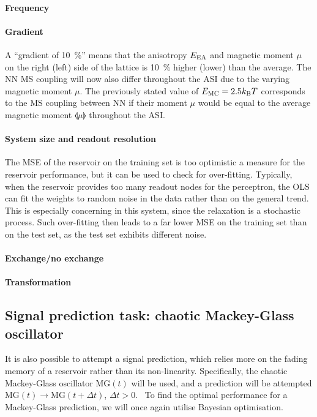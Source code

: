 \paragraph{Frequency}
\paragraph{Gradient}
A ``gradient of \SI{10}{\percent}'' means that the anisotropy $E_\mathrm{EA}$ and magnetic moment $\mu$ on the right (left) side of the lattice is \SI{10}{\percent} higher (lower) than the average.
The NN MS coupling will now also differ throughout the ASI due to the varying magnetic moment $\mu$.
The previously stated value of $\EMC = 2.5 \kBT$ corresponds to the MS coupling between NN if their moment $\mu$ would be equal to the average magnetic moment $\llangle \mu \rrangle$ throughout the ASI.

\paragraph{System size and readout resolution}
The MSE of the reservoir on the training set is too optimistic a measure for the reservoir performance, but it can be used to check for over-fitting.
Typically, when the reservoir provides too many readout nodes for the perceptron, the OLS can fit the weights to random noise in the data rather than on the general trend.
This is especially concerning in this system, since the relaxation is a stochastic process.
Such over-fitting then leads to a far lower MSE on the training set than on the test set, as the test set exhibits different noise.

\paragraph{Exchange/no exchange}
\paragraph{Transformation}
\subsection{Signal prediction task: chaotic Mackey-Glass oscillator}
It is also possible to attempt a signal prediction, which relies more on the fading memory of a reservoir rather than its non-linearity.
Specifically, the chaotic Mackey-Glass oscillator $\mathrm{MG}(t)$ will be used, and a prediction will be attempted
$\mathrm{MG}(t) \rightarrow \mathrm{MG}(t+\Delta t)$, $\Delta t > 0$.~\cite{MackeyGlass}
To find the optimal performance for a Mackey-Glass prediction, we will once again utilise Bayesian optimisation.
